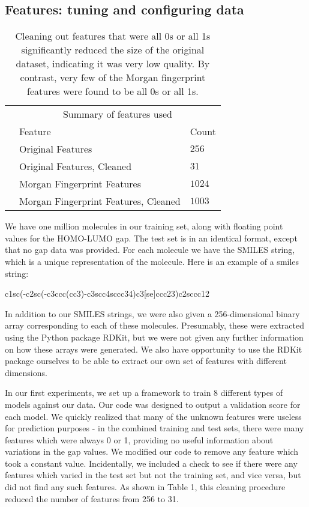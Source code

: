 \documentclass[11pt]{article}
\begin{document}
\subsection {Features: tuning and configuring data}

  \begin{table}
    \centering
    \begin{tabular}{@{}lll@{}}
      &\multicolumn{2}{c}{Summary of features used} \\
      & Feature & Count\\
      \midrule
      & Original Features & $256$ \\
      & Original Features, Cleaned & $31$ \\
      & Morgan Fingerprint Features & $1024$ \\
      & Morgan Fingerprint Features, Cleaned & $1003$ \\
      \bottomrule
      
    \end{tabular}
    \caption{Cleaning out features that were all 0s or all 1s significantly reduced the size of the original dataset, indicating it was very low quality. By contrast, very few of the Morgan fingerprint features were found to be all 0s or all 1s.}
  \end{table}

We have one million molecules in our training set, along with floating point values for the HOMO-LUMO gap. The test set is in an identical format, except that no gap data was provided. For each molecule we have the SMILES string, which is a unique representation of the molecule. Here is an example of a smiles string:
	\begin{center}
		c1sc(-c2sc(-c3ccc(cc3)-c3scc4sccc34)c3[se]ccc23)c2sccc12
	\end{center}
In addition to our SMILES strings, we were also given a 256-dimensional binary array corresponding to each of these molecules. Presumably, these were extracted using the Python package RDKit, but we were not given any further information on how these arrays were generated. We also have opportunity to use the RDKit package ourselves to be able to extract our own set of features with different dimensions. 
	
In our first experiments, we set up a framework to train 8 different types of models against our data. Our code was designed to output a validation score for each model. We quickly realized that many of the unknown features were useless for prediction purposes - in the combined training and test sets, there were many features which were always 0 or 1, providing no useful information about variations in the gap values. We modified our code to remove any feature which took a constant value. Incidentally, we included a check to see if there were any features which varied in the test set but not the training set, and vice versa, but did not find any such features. As shown in Table 1, this cleaning procedure reduced the number of features from 256 to 31.
\end{document}
